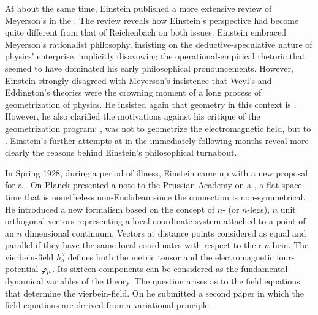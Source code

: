 \documentclass[draft]{article}
\renewcommand{\me}{;~m.e.{}}
\newcommand{\nbein}{$n$-bein\xspace}
\newcommand{\vbein}{vierbein\xspace}
\newcommand{\hbein}{\ensuremath{h_{a}^{\nu}}\xspace}
\begin{document}
At about the same time, Einstein published a more extensive review of Meyerson's  \citep{Meyerson1925} in the . The review reveals how Einstein's perspective had become quite different from that of Reichenbach on both issues. Einstein embraced Meyerson's rationalist philosophy, insisting on the deductive-speculative nature of physics' enterprise, implicitly disavowing the operational-empirical rhetoric that seemed to have dominated his early philosophical pronouncements. However, Einstein strongly disagreed with Meyerson's insistence that Weyl's and Eddington's theories were the crowning moment of a long process of geometrization of physics. He insisted again that geometry in this context is  \citep[165\me]{Einstein1928b}. However, he also clarified the motivations against his critique of the geometrization program: , was not to geometrize the electromagnetic field, but to  \citep[165\me]{Einstein1928b}. Einstein's further attempts at \uft in the immediately following months reveal more clearly the reasons behind Einstein's philosophical turnabout.

In Spring 1928, during a period of illness, Einstein came up with a new proposal for a \uft. On  Planck presented a note to the Prussian Academy on a  \citep{Einstein19281}, a flat space-time that is nonetheless non-Euclidean since the connection \Gtmn is non-symmetrical. He introduced a new formalism based on the concept of $n$- (or $n$-legs), $n$ unit orthogonal vectors representing a local coordinate system attached to a point of an $n$ dimensional continuum. Vectors at distance points considered as equal and parallel if they have the same local coordinates with respect to their \nbein. The \vbein-field \hbein defines both the metric tensor \gmn and the electromagnetic four-potential $\varphi_{\mu}$. Its sixteen components can be considered as the fundamental dynamical variables of the theory. The question arises as to the field equations that determine the \vbein-field. On  he submitted a second paper in which the field equations are derived from a variational principle \citep{Einstein19282}.
\end{document}
